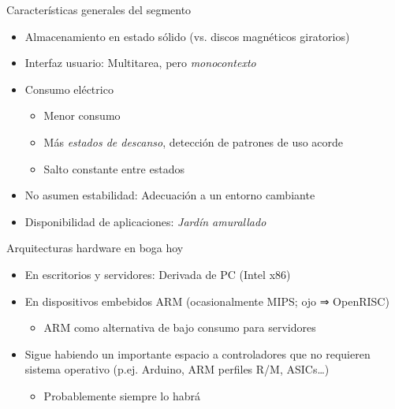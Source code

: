 \documentclass[presentation]{beamer}
\begin{document}
\begin{frame}[label={sec:org4a4ed8b}]{Características generales del segmento}
\begin{itemize}
\item Almacenamiento en estado sólido (vs. discos magnéticos giratorios)
\item Interfaz usuario: Multitarea, pero \emph{monocontexto}
\item Consumo eléctrico
\begin{itemize}
\item Menor consumo
\item Más \emph{estados de descanso}, detección de patrones de uso acorde
\item Salto constante entre estados
\end{itemize}
\item No asumen estabilidad: Adecuación a un entorno cambiante
\item Disponibilidad de aplicaciones: \emph{Jardín amurallado}
\end{itemize}
\end{frame}

\begin{frame}[label={sec:org08c4e2a}]{Arquitecturas hardware en boga hoy}
\begin{itemize}
\item En escritorios y servidores: Derivada de PC (Intel x86)
\item En dispositivos embebidos ARM (ocasionalmente MIPS; ojo ⇒ OpenRISC)
\begin{itemize}
\item ARM como alternativa de bajo consumo para servidores
\end{itemize}
\item Sigue habiendo un importante espacio a controladores que no
requieren sistema operativo (p.ej. Arduino, ARM perfiles R/M,
ASICs\ldots{})
\begin{itemize}
\item Probablemente siempre lo habrá
\end{itemize}
\end{itemize}
\end{frame}
\end{document}
